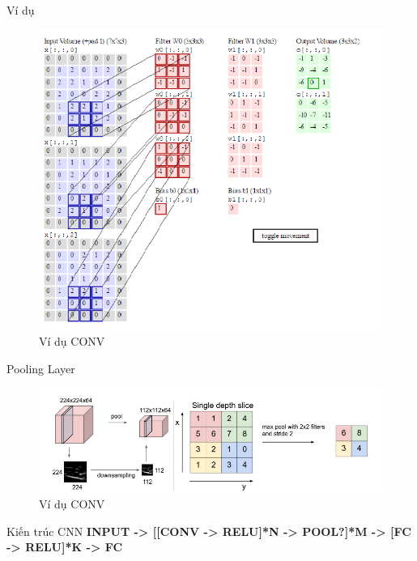 \documentclass[compress]{beamer}
\begin{document}
\begin{frame}{Ví dụ}
\begin{figure}[H]
\includegraphics[scale=0.5]{img3.png}
\caption{Ví dụ CONV}
\end{figure}
\end{frame}
\begin{frame}{Pooling Layer}
\begin{figure}[H]
\includegraphics[scale=0.5]{img4.png}
\caption{Ví dụ CONV}
\end{figure}
\end{frame}
\begin{frame}{Kiến trúc CNN}
\small{
\textbf{INPUT -> [[CONV -> RELU]*N -> POOL?]*M -> [FC -> RELU]*K -> FC}
}

\end{frame}
\end{document}
